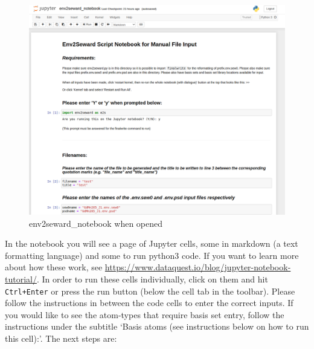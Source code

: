 \documentclass[10pt]{article}
\begin{document}
\begin{figure}
	\centering
	\includegraphics[width=1.3\linewidth]{notebook.png}
	\caption{env2seward\_notebook when opened}
	\label{fig:screenshot-from-2020-06-23-12-26-25}
\end{figure}

In the notebook you will see a page of Jupyter cells, some in markdown (a text formatting language) and some to run python3 code. If you want to learn more about how these work, see \url{https://www.dataquest.io/blog/jupyter-notebook-tutorial/}. In order to run these cells individually, click on them and hit \texttt{Ctrl+Enter} or press the run button (below the cell tab in the toolbar). Please follow the instructions in between the code cells to enter the correct inputs.
If you would like to see the atom-types that require basis set entry, follow the instructions under the subtitle `Basis atoms (see instructions below on how to run this cell):'. The next steps are:
\end{document}
